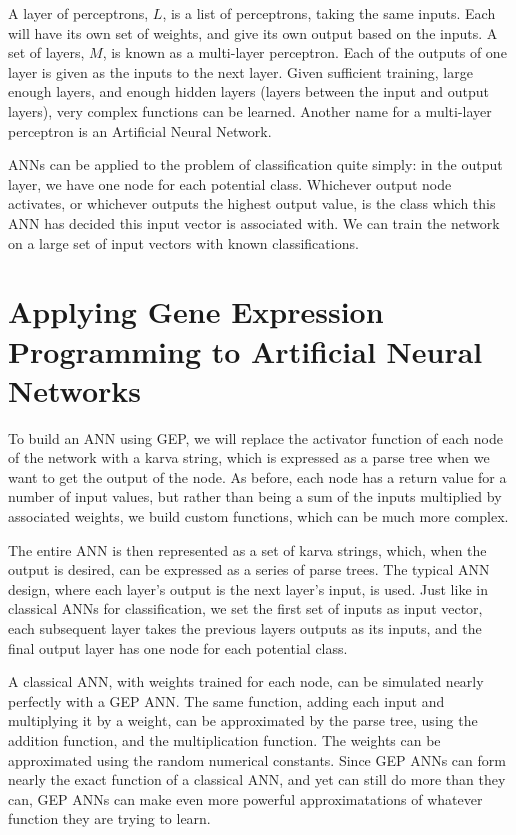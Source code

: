 \documentclass[a4paper,11pt]{report}
\begin{document}
A layer of perceptrons, $L$, is a list of perceptrons, taking the same inputs. Each will have its own set 
of weights, and give its own output based on the inputs. A set of layers, $M$, is known as a multi-layer 
perceptron. Each of the outputs of one layer is given as the inputs to the next layer. Given sufficient 
training, large enough layers, and enough hidden layers (layers between the input and output layers), very 
complex functions can be learned. Another name for a 
multi-layer perceptron is an Artificial Neural Network. 

ANNs can be applied to the problem of classification quite simply: in the output layer, we have one node 
for each potential class. Whichever output node activates, or whichever outputs the highest output value, 
is the class which this ANN has decided this input vector is associated with. We can train the network 
on a large set of input vectors with known classifications.

\section{Applying Gene Expression Programming to Artificial Neural Networks}

To build an ANN using GEP, we will replace the activator function of each node of the network with a karva string, 
which is expressed as a parse tree when we want to get the output of the node. As before, each node has 
a return value for a number of input values, but rather than being a sum of the inputs multiplied by associated 
weights, we build custom functions, which can be much more complex. 

The entire ANN is then represented as a set of karva strings, which, when the output is desired, can be expressed 
as a series of parse trees. The typical ANN design, where each layer's output is the next layer's input, is used. 
Just like in classical ANNs for classification, we set the first set of inputs as input vector, each subsequent layer 
takes the previous layers outputs as its inputs, and the final output layer has one node for each potential class. 

A classical ANN, with weights trained for each node, can be simulated nearly perfectly with a GEP ANN. The same function, 
adding each input and multiplying it by a weight, can be approximated by the parse tree, using the addition function, 
and the multiplication function. The weights can be approximated using the random numerical constants. Since GEP ANNs 
can form nearly the exact function of a classical ANN, and yet can still do more than they can, GEP ANNs can make even 
more powerful approximatations of whatever function they are trying to learn. 
\end{document}
